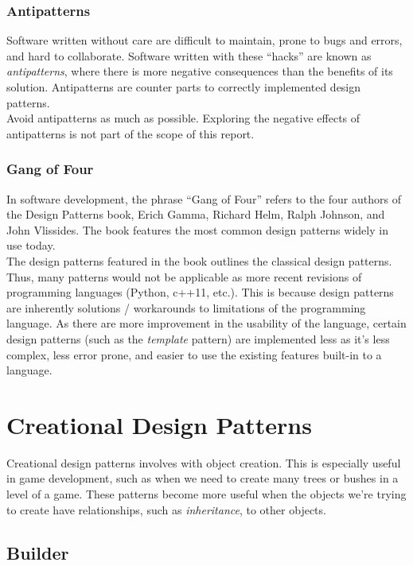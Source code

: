 \documentclass[10pt,letterpaper]{article}
\newcommand{\bs}{\bigskip}
\begin{document}
\begin{multicols}{2}
\subsubsection{Antipatterns}
Software written without care are difficult to maintain, prone to bugs and errors, and hard to collaborate. Software written with these ``hacks'' are known as \textit{antipatterns}, where there is more negative consequences than the benefits of its solution. Antipatterns are counter parts to correctly implemented design patterns.\cite{sm-antipatterns}\bs
\\
Avoid antipatterns as much as possible. Exploring the negative effects of antipatterns is not part of the scope of this report.

\subsubsection{Gang of Four}

In software development, the phrase ``Gang of Four'' refers to the four authors of the Design Patterns book, Erich Gamma, Richard Helm, Ralph Johnson, and John Vlissides\cite{gof-wiki}\cite{gof}. The book features the most common design patterns widely in use today.\bs
\\
The design patterns featured in the book outlines the classical design patterns. Thus, many patterns would not be applicable as more recent revisions of programming languages (Python, c++11, etc.). This is because design patterns are inherently solutions / workarounds to limitations of the programming language. As there are more improvement in the usability of the language, certain design patterns (such as the \textit{template} pattern) are implemented less as it's less complex, less error prone, and easier to use the existing features built-in to a language.


\section{Creational Design Patterns}

Creational design patterns involves with object creation.\cite{sm-creationaldp} This is especially useful in game development, such as when we need to create many trees or bushes in a level of a game. These patterns become more useful when the objects we're trying to create have relationships, such as \textit{inheritance}, to other objects.

\subsection{Builder}


\end{multicols}
\end{document}
